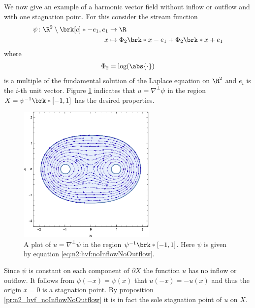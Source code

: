We now give an example of a harmonic vector field without 
inflow or outflow and with one stagnation point.
For this consider the stream function
\begin{equation}
  \begin{aligned}
  \psi\colon\R^2\setminus\brk[c]*{-e_1,e_1}&\to\R \\
  x&\mapsto\Phi_2\brk*{x-e_1}+\Phi_2\brk*{x+e_1}
  \end{aligned}\label{eq:n2:hvf:noInflowNoOutflow}
\end{equation}
where
\begin{align*}
  \Phi_2=\log(\abs{\cdot})
\end{align*}
is a multiple of the fundamental solution of the Laplace equation on $\R^2$ and $e_i$ is the $i$-th unit vector.
Figure \ref{pl:n2_hvf_noInflowNoOutflow} indicates that $u=\nabla^\perp\psi$
in the region $X=\psi^{-1}\brk*{[-1,1]}$ has the desired properties.
\begin{figure}
  \centering
  \includegraphics[width=0.6\textwidth]{../Plots/HarmonicVectorFields_gr1.eps}
  \caption{A plot of $u=\nabla^\perp\psi$ in the region $\psi^{-1}\brk*{[-1,1]}$.
    Here $\psi$ is given by equation \eqref{eq:n2:hvf:noInflowNoOutflow}.}
  \label{pl:n2_hvf_noInflowNoOutflow}
\end{figure}
Since $\psi$ is constant on each component of $\partial X$ the function $u$ has 
no inflow or outflow.
It follows from $\psi(-x)=\psi(x)$ that $u(-x)=-u(x)$ 
and thus the origin $x=0$ is a stagnation point.
By proposition \ref{pr:n2_hvf_noInflowNoOutflow} it is in fact the
sole stagnation point of $u$ on $X$.


